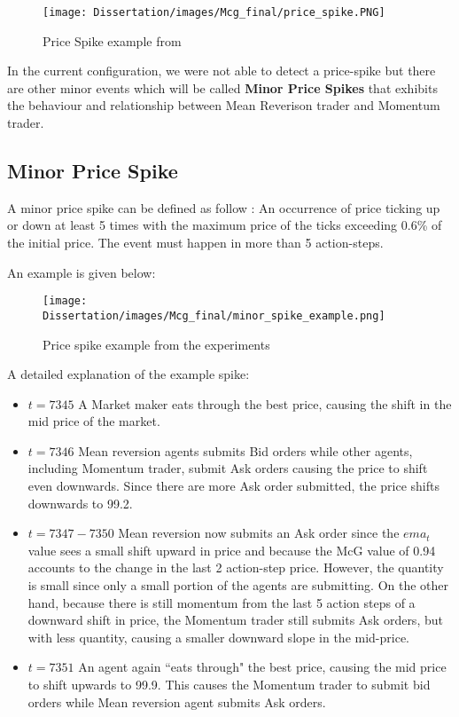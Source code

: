 \begin{figure}[h]
\texttt{[image: Dissertation/images/Mcg\_final/price\_spike.PNG]}
\caption{Price Spike example from \cite{McGroarty}}  
\end{figure} 
\FloatBarrier

In the current configuration, we were not able to detect a price-spike but there are other minor events which will be called \textbf{Minor Price Spikes} that exhibits the behaviour and relationship between Mean Reverison trader and Momentum trader. 

\subsection{Minor Price Spike}

A minor price spike can be defined as follow : An occurrence of price ticking up or down at least 5 times  with the maximum price of the ticks exceeding 0.6\% of the initial price. The event must happen in more than 5 action-steps. 

An example is given below: 
\begin{figure}[h]
\texttt{[image: Dissertation/images/Mcg\_final/minor\_spike\_example.png]}
\caption{Price spike example from the experiments}  
\end{figure} 
\FloatBarrier

A detailed explanation of the example spike: 
\begin{itemize}
  \item $ t = 7345$ A Market maker eats through the best price, causing the shift in the mid price of the market. 
  \item $ t = 7346 $ Mean reversion agents submits Bid orders while other agents, including Momentum trader, submit Ask orders causing the price to shift even downwards. Since there are more Ask order submitted, the price shifts downwards to 99.2. 
  \item $ t = 7347-7350 $ Mean reversion now submits an Ask order since the $ema_t$ value sees a small shift upward in price and because the McG value of 0.94 accounts to the change in the last 2 action-step price. However, the quantity is small since only a small portion of the agents are submitting. On the other hand, because there is still momentum from the last 5 action steps of a downward shift in price, the Momentum trader still submits Ask orders, but with less quantity, causing a smaller downward slope in the mid-price. 
  \item $ t = 7351 $ An agent again ``eats through" the best price, causing the mid price to shift upwards to 99.9. This causes the Momentum trader to submit bid orders while Mean reversion agent submits Ask orders. 
\end{itemize}


